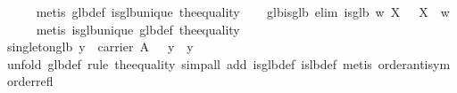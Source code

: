 \begin{isabellebody}
%
\isadelimproof
\ \ \ \ %
\endisadelimproof
%
\isatagproof
{}\isamarkupfalse%
\ {}metis\ glb{}def\ is{}glb{}unique\ the{}equality{}%
\endisatagproof
{\isafoldproof}%
%
\isadelimproof
\isanewline
%
\endisadelimproof
\isanewline
\ \ \isamarkupfalse%
\ glb{}is{}glb\ {}elim{}{}{}\ {}is{}glb\ w\ X\ {}\ {}\ X\ {}\ w{}\isanewline
%
\isadelimproof
\ \ \ \ %
\endisadelimproof
%
\isatagproof
{}\isamarkupfalse%
\ {}metis\ is{}glb{}unique\ glb{}def\ the{}equality{}%
\endisatagproof
{\isafoldproof}%
%
\isadelimproof
\isanewline
%
\endisadelimproof
\isanewline
\ \ \isamarkupfalse%
\ singleton{}glb{}\ {}y\ {}\ carrier\ A\ {}\ {}\ {}y{}\ {}\ y{}\isanewline
%
\isadelimproof
\ \ \ \ %
\endisadelimproof
%
\isatagproof
{}\isamarkupfalse%
\ {}unfold\ glb{}def{}\ rule\ the{}equality{}\ simp{}all\ add{}\ is{}glb{}def\ is{}lb{}def{}\ metis\ order{}antisym\ order{}refl{}%

\end{isabellebody}
